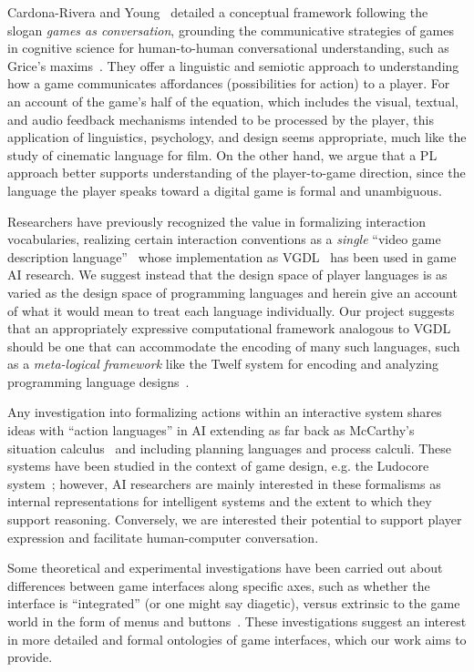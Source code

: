
Cardona-Rivera and Young~\cite{cardona2014games}
detailed a conceptual framework following the slogan {\em games as
conversation}, grounding the communicative strategies of games in cognitive
science for human-to-human conversational understanding, such as Grice's
maxims~\cite{grice1975logic}. They offer a linguistic and semiotic approach to
understanding how a game communicates affordances (possibilities for
action) to a player.  For an account of the game's half of the equation,
which includes the visual, textual, and audio feedback mechanisms intended
to be processed by the player, this application of linguistics, psychology,
and design seems appropriate, much like the study of cinematic language for
film.  On the other hand, we argue that a PL approach better supports
understanding of the player-to-game direction, since the language the
player speaks toward a digital game is formal and unambiguous.

Researchers have previously recognized the value in formalizing interaction
vocabularies, realizing certain interaction conventions as a {\em single}
``video game description language''~\cite{ebner2013towards} whose
implementation as VGDL~\cite{schaul2013video} has been used in game AI research. We
suggest instead that the design space of player languages is as varied as
the design space of programming languages and herein give an account of
what it would mean to treat each language individually.
Our project suggests that an appropriately expressive computational
framework analogous to VGDL should be one that can accommodate the encoding
of many such languages, such as a {\em meta-logical framework} like the
Twelf system for encoding and analyzing programming language
designs~\cite{pfenning1999system}. 

Any investigation into formalizing actions within an interactive system
shares ideas with ``action languages'' in AI extending as far back as
McCarthy's situation calculus~\cite{mccarthy1969some} and including
planning languages and process calculi.  These systems have been studied in the
context of game design, e.g. the Ludocore system~\cite{smith2010ludocore};
however, AI researchers are mainly interested in these formalisms as internal
representations for intelligent systems and the extent to which they support
reasoning.  Conversely, we are interested their potential to support player
expression and facilitate human-computer conversation.

Some theoretical and experimental investigations have been carried out
about differences between game interfaces along specific axes, such as
whether the interface is ``integrated'' (or one might say diagetic), versus
extrinsic to the game world in the form of menus and
buttons~\cite{llanos2011players, jorgensen2013gameworld}. These
investigations suggest an interest in more detailed and formal ontologies
of game interfaces, which our work aims to provide.


